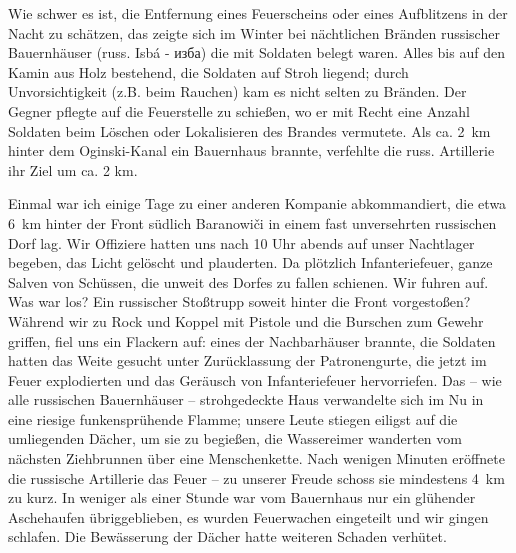 Wie schwer es ist, die Entfernung eines Feuerscheins oder eines Aufblitzens in der Nacht zu schätzen, das zeigte sich im Winter bei nächtlichen Bränden russischer Bauernhäuser (russ. Isbá - изба) die mit Soldaten belegt waren. Alles bis auf den Kamin aus Holz bestehend, die Soldaten auf Stroh liegend; durch Unvorsichtigkeit (z.B. beim Rauchen) kam es nicht selten zu Bränden. Der Gegner pflegte auf die Feuerstelle zu schießen, wo er mit Recht eine Anzahl Soldaten beim Löschen oder Lokalisieren des Brandes vermutete. Als ca. 2~km hinter dem Oginski-Kanal ein Bauernhaus brannte, verfehlte die russ. Artillerie ihr Ziel um ca. 2 km.

Einmal war ich einige Tage zu einer anderen Kompanie abkommandiert, die etwa 6~km hinter der Front südlich Baranowiči in einem fast unversehrten russischen Dorf lag. Wir Offiziere hatten uns nach 10 Uhr abends auf unser Nachtlager begeben, das Licht gelöscht und plauderten. Da plötzlich Infanteriefeuer, ganze Salven von Schüssen, die unweit des Dorfes zu fallen schienen. Wir fuhren auf. Was war los? Ein russischer Stoßtrupp soweit hinter die Front vorgestoßen? Während wir zu Rock und Koppel mit Pistole und die Burschen zum Gewehr griffen, fiel uns ein Flackern auf: eines der Nachbarhäuser brannte, die Soldaten hatten das Weite gesucht unter Zurücklassung der Patronengurte, die jetzt im Feuer explodierten und das Geräusch von Infanteriefeuer hervorriefen. Das -- wie alle russischen Bauernhäuser -- strohgedeckte Haus verwandelte sich im Nu in eine riesige funkensprühende Flamme; unsere Leute stiegen eiligst auf die umliegenden Dächer, um sie zu begießen, die Wassereimer wanderten vom nächsten Ziehbrunnen über eine Menschenkette. Nach wenigen Minuten eröffnete die russische Artillerie das Feuer -- zu unserer Freude schoss sie mindestens 4~km zu kurz. In weniger als einer Stunde war vom Bauernhaus nur ein glühender Aschehaufen übriggeblieben, es wurden Feuerwachen eingeteilt und wir gingen schlafen. Die Bewässerung der Dächer hatte weiteren Schaden verhütet.

